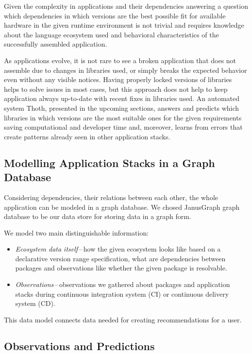\documentclass[a4paper]{llncs}
\begin{document}
Given the complexity in applications and their dependencies answering a question which dependencies in which versions are the best possible fit for available hardware in the given runtime environment is not trivial and requires knowledge about the language ecosystem used and behavioral characteristics of the successfully assembled application.

As applications evolve, it is not rare to see a broken application that does not assemble due to changes in libraries used, or simply breaks the expected behavior even without any visible notices. Having properly locked versions of libraries helps to solve issues in most cases, but this approach does not help to keep application always up-to-date with recent fixes in libraries used. An automated system Thoth, presented in the upcoming sections, answers and predicts which libraries in which versions are the most suitable ones for the given requirements saving computational and developer time and, moreover, learns from errors that create patterns already seen in other application stacks.

\subsection{Modelling Application Stacks in a Graph Database} \label{section_modelling_app_stacks}

Considering dependencies, their relations between each other, the whole application can be modeled in a graph database. We chosed JanusGraph graph database to be our data store for storing data in a graph form.

We model two main distinguishable information:

\begin{itemize}
  \item \emph{Ecosystem data itself}\,--\,how the given ecosystem looks like based on a declarative version range specification, what are dependencies between packages and observations like whether the given package is resolvable.
  \item \emph{Observations}\,--\,observations we gathered about packages and application stacks during continuous integration system (CI) or continuous delivery system (CD).
\end{itemize}

This data model connects data needed for creating recommendations for a user.

\subsection{Observations and Predictions}
\end{document}
